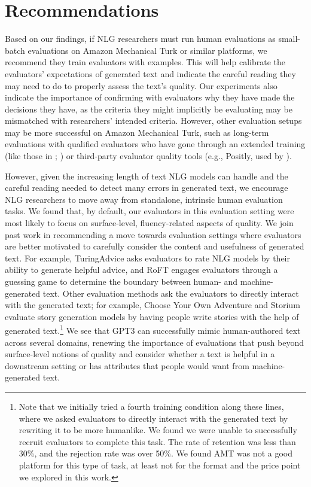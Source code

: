 \section{Recommendations}\label{sec:recommendations}
Based on our findings, if NLG researchers must run human evaluations as small-batch evaluations on Amazon Mechanical Turk or similar platforms, we recommend they train evaluators with examples.
This will help calibrate the evaluators' expectations of generated text and indicate the careful reading they may need to do to properly assess the text's quality.
Our experiments also indicate the importance of confirming with evaluators why they have made the decisions they have, as the criteria they might implicitly be evaluating may be mismatched with researchers' intended criteria.
However, other evaluation setups may be more successful on Amazon Mechanical Turk, such as long-term evaluations with qualified evaluators who have gone through an extended training (like those in \citealp{10.1145/1460563.1460572}; \citealp{zellers-etal-2019-hellaswag}) or third-party evaluator quality tools (e.g., Positly, used by \citealp{gpt3}).

However, given the increasing length of text NLG models can handle and the careful reading needed to detect many errors in generated text, we encourage NLG researchers to move away from standalone, intrinsic human evaluation tasks.
We found that, by default,
our evaluators in this evaluation setting were most likely to focus on surface-level, fluency-related aspects of quality.
We join past work \citep{belz-reiter-2006-comparing, vanderlee_journal} in recommending a move towards evaluation settings where evaluators are better motivated to carefully consider the content and usefulness of generated text.
For example, TuringAdvice \citep{zellers_turingadvice} asks evaluators to rate NLG models by their ability to generate helpful advice, and RoFT \citep{dugan-etal-2020-roft} engages evaluators through a guessing game to determine the boundary between human- and machine-generated text. Other evaluation methods ask the evaluators to directly interact with the generated text; for example, Choose Your Own Adventure \citep{clark-smith-2021-choose} and Storium \citep{akoury-etal-2020-storium} evaluate story generation models by having people write stories with the help of generated text.\footnote{Note that we initially tried a fourth training condition along these lines, where we asked evaluators to directly interact with the generated text by rewriting it to be more humanlike. We found we were unable to successfully recruit evaluators to complete this task. The rate of retention was less than 30\%, and the rejection rate was over 50\%. We found AMT was not a good platform for this type of task, at least not for the format and the price point we explored in this work.}
We see that GPT3 can successfully mimic human-authored text across several domains, renewing the importance of evaluations that push beyond surface-level notions of quality and consider whether a text is helpful in a downstream setting or has attributes that people would want from machine-generated text.

